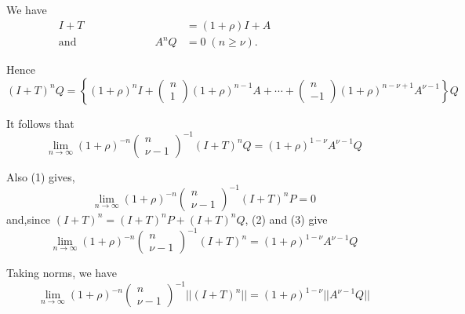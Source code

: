 We have
\begin{align*}
  I+T & = (1+ \rho) I+A \hspace{3cm}\\
  \text{and} \hspace{3cm} A^n Q &  = 0 \; (n \ge \nu).
\end{align*}

Hence
{\fontsize{10}{12}\selectfont
$$
(I + T)^n Q = \left\{ (1 +\rho)^n I + 
\begin{pmatrix} n\\  1 \end{pmatrix} 
(1+\rho)^{n-1} A + \cdots + 
\begin{pmatrix} n\\-1 \end{pmatrix} 
(1+\rho)^{n - \nu +1} A^{\nu-1}\right\} Q 
$$}\relax

It follows that
\begin{equation*}
  \lim_{n \to \infty} (1+\rho)^{-n} 
  \begin{pmatrix} n \\ \nu-1\end{pmatrix}^{-1} 
    (I + T)^n Q = (1+ \rho)^{1-\nu} A ^{\nu-1} Q \tag{2}
\end{equation*}

Also (1) gives,
\begin{equation*}
  \lim_{n \to \infty} (1+\rho)^{-n} 
  \begin{pmatrix} n \\ \nu-1\end{pmatrix}^{-1} 
    (I + T)^n P = 0\tag{3}
\end{equation*}
and,\pageoriginale since $(I + T)^n = (I+T)^n P + (I +T)^n Q$, (2) and
(3) give 
\begin{equation*}
  \lim_{n \to \infty} (1+\rho)^{-n} 
  \begin{pmatrix} n \\ \nu-1\end{pmatrix}^{-1} 
    (I + T)^n  = (1+ \rho)^{1-\nu} A^{\nu-1} Q \tag{4}
\end{equation*}

Taking norms, we have
\begin{equation*}
  \lim_{n \to \infty} (1+\rho)^{-n} 
  \begin{pmatrix}
 n \\ 
\nu-1\end{pmatrix}^{-1} 
    ||(I +T)^n || = (1+\rho)^{1-\nu} ||A^{\nu-1} Q || \tag{5}
\end{equation*}

